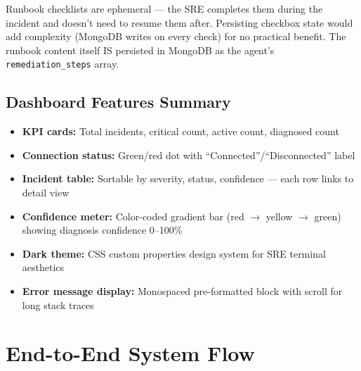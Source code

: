\documentclass[11pt,a4paper]{article}
\begin{document}
\begin{decisionbox}
Runbook checklists are ephemeral — the SRE completes them during the incident and doesn't need
to resume them after. Persisting checkbox state would add complexity (MongoDB writes on every
check) for no practical benefit. The runbook content itself IS persisted in MongoDB as the
agent's \texttt{remediation\_steps} array.
\end{decisionbox}

\subsection{Dashboard Features Summary}

\begin{itemize}[leftmargin=*,itemsep=3pt]
  \item \textbf{KPI cards:} Total incidents, critical count, active count, diagnosed count
  \item \textbf{Connection status:} Green/red dot with ``Connected''/``Disconnected'' label
  \item \textbf{Incident table:} Sortable by severity, status, confidence — each row links to detail view
  \item \textbf{Confidence meter:} Color-coded gradient bar (red $\rightarrow$ yellow $\rightarrow$ green) showing diagnosis confidence 0--100\%
  \item \textbf{Dark theme:} CSS custom properties design system for SRE terminal aesthetics
  \item \textbf{Error message display:} Monospaced pre-formatted block with scroll for long stack traces
\end{itemize}

\section{End-to-End System Flow}
\end{document}
